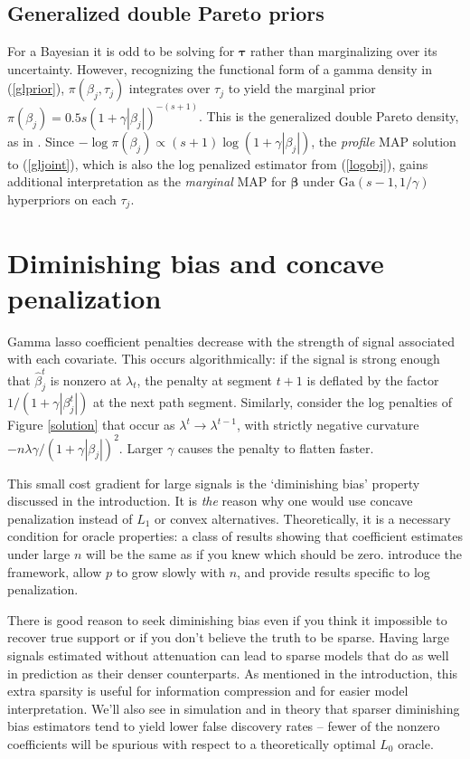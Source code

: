 \documentclass[12pt]{article}
\newcommand{\bs}[1]{\boldsymbol{#1}}
\newcommand{\mr}[1]{\mathrm{#1}}
\begin{document}
\subsection{Generalized double Pareto priors}

For a Bayesian it is odd to be solving for $\bs{\tau}$ rather than
marginalizing over its uncertainty.  However, recognizing the functional form
of a gamma density  in (\ref{glprior}), $\pi(\beta_j,\tau_j)$ integrates over
$\tau_j$ to yield the marginal prior $ \pi(\beta_j) = 0.5s\left( 1+
\gamma|\beta_j|\right)^{-(s+1)}$. This is the generalized double Pareto
density, as in  \citet{armagan_generalized_2013}. Since $-\log \pi(\beta_j)
\propto (s+1)\log(1 + \gamma|\beta_j|)$, the {\it profile} MAP solution to
(\ref{gljoint}), which is also the log penalized estimator from
(\ref{logobj}), gains additional interpretation as the {\it marginal} MAP for
$\bs{\beta}$ under $\mr{Ga}(s-1,1/\gamma)$ hyperpriors on each $\tau_j$.


\section{Diminishing bias and concave penalization}
\label{concave}

Gamma lasso coefficient penalties decrease with the strength of signal
associated with each covariate. This occurs algorithmically: if the signal is
strong enough that $\hat \beta^t_j$ is nonzero at $\lambda_t$,  the penalty at
segment $t+1$ is deflated by the factor $1/(1+ \gamma|\beta^t_j|)$ at the next
path segment. Similarly, consider the log penalties of Figure \ref{solution}
that occur as $\lambda^t
\rightarrow
\lambda^{t-1}$, with strictly negative curvature
$-n\lambda\gamma/(1+\gamma|\beta_j|)^2$. Larger $\gamma$ causes the penalty to
flatten faster.

This small cost gradient for large signals is the `diminishing bias' property
discussed in the introduction. It is {\it the} reason why one would use
concave penalization instead of $L_1$ or convex alternatives.  Theoretically,
it is a necessary condition for oracle
properties: a class of results showing that coefficient estimates under large
$n$ will be the same as if you knew which should be zero.
\citet{fan_variable_2001} introduce the framework, \citet{fan_nonconcave_2004}
allow $p$ to grow slowly with $n$,  and \citet{armagan_posterior_2013} provide
results specific to log penalization. 

There is good reason to seek diminishing bias even
if you think it impossible to recover true support or if you don't believe the
truth to be sparse. Having large signals estimated without attenuation can
lead to sparse models that do as well in prediction as their denser
counterparts.   As mentioned in the introduction, this extra sparsity is
useful for information compression and for easier model interpretation.  We'll
also see in simulation and in theory that sparser diminishing bias estimators
tend to yield lower false discovery rates -- fewer of the nonzero coefficients will
be spurious with respect to a theoretically optimal $L_0$ oracle.
\end{document}
